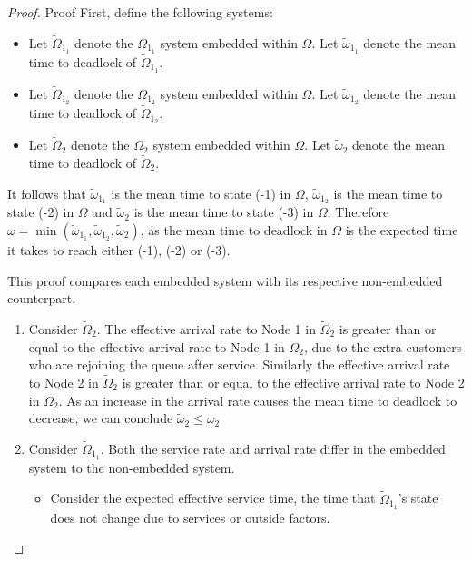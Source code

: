 \documentclass{article}
\numberwithin{equation}{section}
\begin{document}
\begin{proof}{Proof}
First, define the following systems:
\begin{itemize}
  \item Let $\widetilde{\Omega}_{1_1}$ denote the $\Omega_{1_1}$ system embedded within $\Omega$. Let $\widetilde{\omega}_{1_1}$ denote the mean time to deadlock of $\widetilde{\Omega}_{1_1}$.
  \item Let $\widetilde{\Omega}_{1_2}$ denote the $\Omega_{1_2}$ system embedded within $\Omega$. Let $\widetilde{\omega}_{1_2}$ denote the mean time to deadlock of $\widetilde{\Omega}_{1_2}$.
  \item Let $\widetilde{\Omega}_2$ denote the $\Omega_2$ system embedded within $\Omega$. Let $\widetilde{\omega}_2$ denote the mean time to deadlock of $\widetilde{\Omega}_2$.
\end{itemize}

It follows that $\widetilde{\omega}_{1_1}$ is the mean time to state (-1) in $\Omega$, $\widetilde{\omega}_{1_2}$ is the mean time to state (-2) in $\Omega$ and $\widetilde{\omega}_2$ is the mean time to state (-3) in $\Omega$.
Therefore $\omega = \min(\widetilde{\omega}_{1_1}, \widetilde{\omega}_{1_2}, \widetilde{\omega}_2)$, as the mean time to deadlock in $\Omega$ is the expected time it takes to reach either (-1), (-2) or (-3).

This proof compares each embedded system with its respective non-embedded counterpart.

\begin{enumerate}

\item Consider $\widetilde{\Omega}_2$.
The effective arrival rate to Node 1 in $\widetilde{\Omega}_2$ is greater than or equal to the effective arrival rate to Node 1 in $\Omega_2$, due to the extra customers who are rejoining the queue after service.
Similarly the effective arrival rate to Node 2 in $\widetilde{\Omega}_2$ is greater than or equal to the effective arrival rate to Node 2 in $\Omega_2$.
As an increase in the arrival rate causes the mean time to deadlock to decrease, we can conclude $\widetilde{\omega}_2 \leq \omega_2$

\item Consider $\widetilde{\Omega}_{1_1}$. Both the service rate and arrival rate differ in the embedded system to the non-embedded system.

\begin{itemize}

\item Consider the expected effective service time, the time that $\widetilde{\Omega}_{1_1}$'s state does not change due to services or outside factors.


\end{itemize}
\end{enumerate}
\end{proof}
\end{document}
